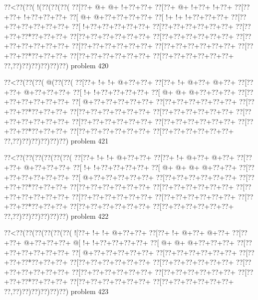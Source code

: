 \vbox{\vbox{\goo
\0??<\0??(\0??(\- !(\0??(\0??(\0??(
\0??[\0??+\- @+\- @+\- !+\0??+\0??+
\0??[\0??+\- @+\- !+\0??+\- !+\0??+
\0??[\0??+\0??+\- !+\0??+\0??+\0??+
\0??[\- @+\- @+\0??+\0??+\0??+\0??+
\0??[\- !+\- !+\- !+\0??+\0??+\0??+
\0??[\0??+\0??+\0??+\0??+\0??+\0??+
\0??[\- !+\0??+\0??+\0??+\0??+\0??+
\0??[\0??+\0??+\0??+\0??+\0??+\0??+
\0??[\0??+\0??+\0??*\0??+\0??+\0??+
\0??[\0??+\0??+\0??+\0??+\0??+\0??+
\0??[\0??+\0??+\0??+\0??+\0??+\0??+
\0??[\0??+\0??+\0??+\0??+\0??+\0??+
\0??[\0??+\0??+\0??+\0??+\0??+\0??+
\0??[\0??+\0??+\0??+\0??+\0??+\0??+
\0??[\0??+\0??+\0??*\0??+\0??+\0??+
\0??[\0??+\0??+\0??+\0??+\0??+\0??+
\0??[\0??+\0??+\0??+\0??+\0??+\0??+
\0??,\0??)\0??)\0??)\0??)\0??)\0??)
}
\hfil problem 420\hfil\break
}

\vbox{\vbox{\goo
\0??<\0??(\0??(\0??(\- @(\0??(\0??(
\0??[\0??+\- !+\- !+\- @+\0??+\0??+
\0??[\0??+\- !+\- @+\0??+\- @+\0??+
\0??[\0??+\0??+\- @+\0??+\0??+\0??+
\0??[\- !+\- !+\0??+\0??+\0??+\0??+
\0??[\- @+\- @+\- @+\0??+\0??+\0??+
\0??[\0??+\0??+\0??+\0??+\0??+\0??+
\0??[\- @+\0??+\0??+\0??+\0??+\0??+
\0??[\0??+\0??+\0??+\0??+\0??+\0??+
\0??[\0??+\0??+\0??*\0??+\0??+\0??+
\0??[\0??+\0??+\0??+\0??+\0??+\0??+
\0??[\0??+\0??+\0??+\0??+\0??+\0??+
\0??[\0??+\0??+\0??+\0??+\0??+\0??+
\0??[\0??+\0??+\0??+\0??+\0??+\0??+
\0??[\0??+\0??+\0??+\0??+\0??+\0??+
\0??[\0??+\0??+\0??*\0??+\0??+\0??+
\0??[\0??+\0??+\0??+\0??+\0??+\0??+
\0??[\0??+\0??+\0??+\0??+\0??+\0??+
\0??,\0??)\0??)\0??)\0??)\0??)\0??)
}
\hfil problem 421\hfil\break
}

\vbox{\vbox{\goo
\0??<\0??(\0??(\0??(\0??(\0??(\0??(
\0??[\0??+\- !+\- !+\- @+\0??+\0??+
\0??[\0??+\- !+\- @+\0??+\- @+\0??+
\0??[\0??+\0??+\- @+\0??+\0??+\0??+
\0??[\- !+\- !+\0??+\0??+\0??+\0??+
\0??[\- @+\- @+\- @+\- @+\0??+\0??+
\0??[\0??+\0??+\0??+\0??+\0??+\0??+
\0??[\- @+\0??+\0??+\0??+\0??+\0??+
\0??[\0??+\0??+\0??+\0??+\0??+\0??+
\0??[\0??+\0??+\0??*\0??+\0??+\0??+
\0??[\0??+\0??+\0??+\0??+\0??+\0??+
\0??[\0??+\0??+\0??+\0??+\0??+\0??+
\0??[\0??+\0??+\0??+\0??+\0??+\0??+
\0??[\0??+\0??+\0??+\0??+\0??+\0??+
\0??[\0??+\0??+\0??+\0??+\0??+\0??+
\0??[\0??+\0??+\0??*\0??+\0??+\0??+
\0??[\0??+\0??+\0??+\0??+\0??+\0??+
\0??[\0??+\0??+\0??+\0??+\0??+\0??+
\0??,\0??)\0??)\0??)\0??)\0??)\0??)
}
\hfil problem 422\hfil\break
}

\vbox{\vbox{\goo
\0??<\0??(\0??(\0??(\0??(\0??(\0??(
\- ![\0??+\- !+\- !+\- @+\0??+\0??+
\0??[\0??+\- !+\- @+\0??+\- @+\0??+
\0??[\0??+\0??+\- @+\0??+\0??+\0??+
\- @[\- !+\- !+\0??+\0??+\0??+\0??+
\0??[\- @+\- @+\- @+\0??+\0??+\0??+
\0??[\0??+\0??+\0??+\0??+\0??+\0??+
\0??[\- @+\0??+\0??+\0??+\0??+\0??+
\0??[\0??+\0??+\0??+\0??+\0??+\0??+
\0??[\0??+\0??+\0??*\0??+\0??+\0??+
\0??[\0??+\0??+\0??+\0??+\0??+\0??+
\0??[\0??+\0??+\0??+\0??+\0??+\0??+
\0??[\0??+\0??+\0??+\0??+\0??+\0??+
\0??[\0??+\0??+\0??+\0??+\0??+\0??+
\0??[\0??+\0??+\0??+\0??+\0??+\0??+
\0??[\0??+\0??+\0??*\0??+\0??+\0??+
\0??[\0??+\0??+\0??+\0??+\0??+\0??+
\0??[\0??+\0??+\0??+\0??+\0??+\0??+
\0??,\0??)\0??)\0??)\0??)\0??)\0??)
}
\hfil problem 423\hfil\break
}

